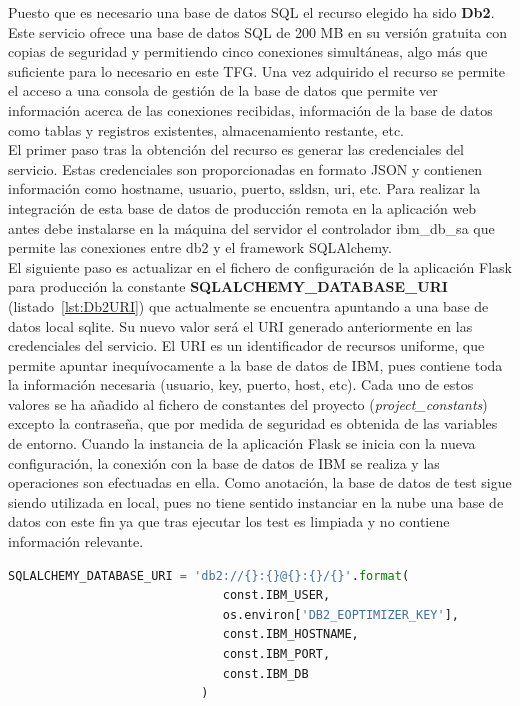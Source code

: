 Puesto que es necesario una base de datos SQL el recurso elegido ha sido \textbf{Db2}. Este servicio ofrece una base de datos SQL de 200 MB en su versión gratuita con copias de seguridad y permitiendo cinco conexiones simultáneas, algo más que suficiente para lo necesario en este \gls{TFG}. Una vez adquirido el recurso se permite el acceso a una consola de gestión de la base de datos que permite ver información acerca de las conexiones recibidas, información de la base de datos como tablas y registros existentes, almacenamiento restante, etc.\\El primer paso tras la obtención del recurso es generar las credenciales del servicio. Estas credenciales son proporcionadas en formato \gls{JSON} y contienen información como hostname, usuario, puerto, ssldsn, uri, etc. Para realizar la integración de esta base de datos de producción remota en la aplicación web antes debe instalarse en la máquina del servidor el controlador ibm\_db\_sa que permite las conexiones entre db2 y el framework SQLAlchemy.\\El siguiente paso es actualizar en el fichero de configuración de la aplicación Flask para producción la constante \textbf{SQLALCHEMY\_DATABASE\_URI} (listado~\ref{lst:Db2URI}) que actualmente se encuentra apuntando a una base de datos local sqlite. Su nuevo valor será el URI generado anteriormente en las credenciales del servicio. El URI es un identificador de recursos uniforme, que permite apuntar inequívocamente a la base de datos de IBM, pues contiene toda la información necesaria (usuario, key, puerto, host, etc). Cada uno de estos valores se ha añadido al fichero de constantes del proyecto (\textit{project\_constants}) excepto la contraseña, que por medida de seguridad es obtenida de las variables de entorno. Cuando la instancia de la aplicación Flask se inicia con la nueva configuración, la conexión con la base de datos de IBM se realiza y las operaciones son efectuadas en ella. Como anotación, la base de datos de test sigue siendo utilizada en local, pues no tiene sentido instanciar en la nube una base de datos con este fin ya que tras ejecutar los test es limpiada y no contiene información relevante.\\
\begin{lstlisting}[language=Python,float=ht,numbers=none,caption={URI de Db2 para SQLAlchemy en \textit{prod\_config}},label={lst:Db2URI}]
SQLALCHEMY_DATABASE_URI = 'db2://{}:{}@{}:{}/{}'.format(
                              const.IBM_USER,
                              os.environ['DB2_EOPTIMIZER_KEY'],
                              const.IBM_HOSTNAME,
                              const.IBM_PORT,
                              const.IBM_DB
                           )
\end{lstlisting}

